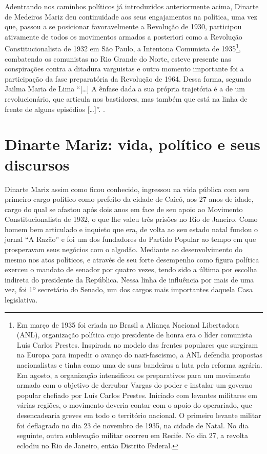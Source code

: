 \begin{refsection}
    Adentrando nos caminhos políticos já introduzidos anteriormente acima, Dinarte de Medeiros Mariz deu continuidade aos seus engajamentos na política, uma vez que, passou a se posicionar favoravelmente a Revolução de 1930, participou ativamente de todos os movimentos armados a posteriori como a Revolução Constitucionalista de 1932 em São Paulo, a Intentona Comunista de 1935\footnote{Em março de 1935 foi criada no Brasil a Aliança Nacional Libertadora (ANL), organização política cujo presidente de honra era o líder comunista Luís Carlos Prestes. Inspirada no modelo das frentes populares que surgiram na Europa para impedir o avanço do nazi-fascismo, a ANL defendia propostas nacionalistas e tinha como uma de suas bandeiras a luta pela reforma agrária. Em agosto, a organização intensificou os preparativos para um movimento armado com o objetivo de derrubar Vargas do poder e instalar um governo popular chefiado por Luís Carlos Prestes. Iniciado com levantes militares em várias regiões, o movimento deveria contar com o apoio do operariado, que desencadearia greves em todo o território nacional. O primeiro levante militar foi deflagrado no dia 23 de novembro de 1935, na cidade de Natal. No dia seguinte, outra sublevação militar ocorreu em Recife. No dia 27, a revolta eclodiu no Rio de Janeiro, então Distrito Federal.}, combatendo os comunistas no Rio Grande do Norte, esteve presente nas conspirações contra a ditadura varguistas e outro momento importante foi a participação da fase preparatória da Revolução de 1964. Dessa forma, segundo Jailma Maria de Lima ``[\dots] A ênfase dada a sua própria trajetória é a de um revolucionário, que articula nos bastidores, mas também que está na linha de frente de alguns episódios [\dots]''. \cite[p.~11]{Lima2013Memoria}.

    \section{Dinarte Mariz: vida, político e seus discursos}

    Dinarte Mariz assim como ficou conhecido, ingressou na vida pública com seu primeiro cargo político como prefeito da cidade de Caicó, aos 27 anos de idade, cargo do qual se afastou após dois anos em face de seu apoio ao Movimento Constitucionalista de 1932, o que lhe valeu três prisões no Rio de Janeiro. Como homem bem articulado e inquieto que era, de volta ao seu estado natal fundou o jornal ``A Razão'' e foi um dos fundadores do Partido Popular ao tempo em que prosperavam seus negócios com o algodão. Mediante ao desenvolvimento do mesmo nos atos políticos, e através de seu forte desempenho como figura política exerceu o mandato de senador por quatro vezes, tendo sido a última por escolha indireta do presidente da República. Nessa linha de influência por mais de uma vez, foi 1º secretário do Senado, um dos cargos mais importantes daquela Casa legislativa. 


\end{refsection}

